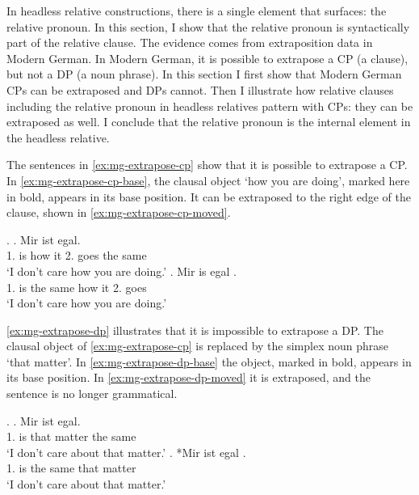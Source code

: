  In headless relative constructions, there is a single element that surfaces: the relative pronoun. In this section, I show that the relative pronoun is syntactically part of the relative clause. The evidence comes from extraposition data in Modern German. In Modern German, it is possible to extrapose a CP (a clause), but not a DP (a noun phrase). In this section I first show that Modern German CPs can be extraposed and DPs cannot. Then I illustrate how relative clauses including the relative pronoun in headless relatives pattern with CPs: they can be extraposed as well. I conclude that the relative pronoun is the internal element in the headless relative.

 The sentences in \ref{ex:mg-extrapose-cp} show that it is possible to extrapose a CP. In \ref{ex:mg-extrapose-cp-base}, the clausal object  `how you are doing', marked here in bold, appears in its base position. It can be extraposed to the right edge of the clause, shown in \ref{ex:mg-extrapose-cp-moved}.

 \ex.\label{ex:mg-extrapose-cp}
 \ag. Mir ist     egal.\\
  1. is how it 2. goes {the same}\\
  `I don't care how you are doing.'\label{ex:mg-extrapose-cp-base}
 \bg. Mir is egal    .\\
  1. is {the same} how it 2. goes\\
  `I don't care how you are doing.' \label{ex:mg-extrapose-cp-moved}

 \ref{ex:mg-extrapose-dp} illustrates that it is impossible to extrapose a DP. The clausal object of \ref{ex:mg-extrapose-cp} is replaced by the simplex noun phrase  `that matter'.
 In \ref{ex:mg-extrapose-dp-base} the object, marked in bold, appears in its base position. In \ref{ex:mg-extrapose-dp-moved} it is extraposed, and the sentence is no longer grammatical.

 \ex.\label{ex:mg-extrapose-dp}
 \ag. Mir ist   egal.\\
  1. is that matter {the same}\\
  `I don't care about that matter.'\label{ex:mg-extrapose-dp-base}
 \bg. *Mir ist egal  .\\
  1. is {the same} that matter\\
  `I don't care about that matter.' \label{ex:mg-extrapose-dp-moved}

